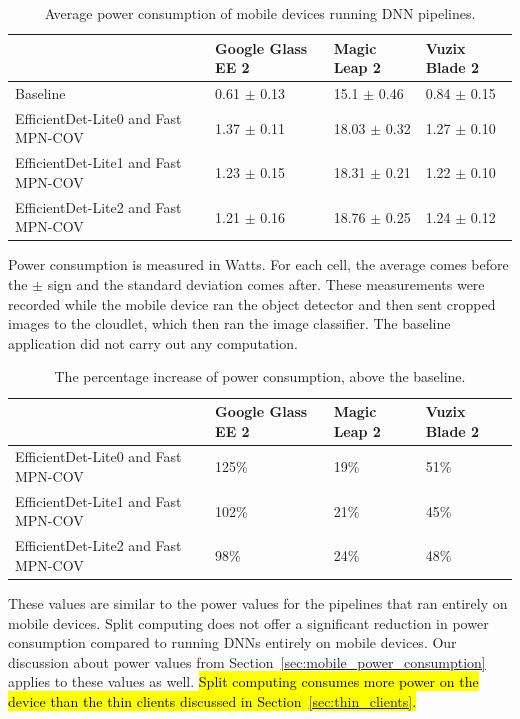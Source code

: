 \begin{table}
\begin{tabular}{|l||l|l|l|}
  \hline
  & Google Glass EE 2 & Magic Leap 2 & Vuzix Blade 2\\
  \hline
  \hline
  Baseline & 0.61 $\pm$ 0.13 & 15.1 $\pm$ 0.46 & 0.84 $\pm$ 0.15\\
  EfficientDet-Lite0 and Fast MPN-COV & 1.37 $\pm$ 0.11 & 18.03 $\pm$ 0.32 & 1.27 $\pm$ 0.10\\
  EfficientDet-Lite1 and Fast MPN-COV & 1.23 $\pm$ 0.15 & 18.31 $\pm$ 0.21 & 1.22 $\pm$ 0.10\\
  EfficientDet-Lite2 and Fast MPN-COV & 1.21 $\pm$ 0.16 & 18.76 $\pm$ 0.25 & 1.24 $\pm$ 0.12\\
  \hline
\end{tabular}
\begin{captiontext}
  Power consumption is measured in Watts.
  For each cell, the average comes before the $\pm$ sign and the standard
    deviation comes after.
    These measurements were recorded while the mobile device ran the object
    detector and then sent cropped images to the cloudlet, which then ran the
    image classifier.
    The baseline application did not carry out any computation.
  \end{captiontext}
  \caption{
    Average power consumption of mobile devices running DNN pipelines.
  }\label{tab:split_power}
\end{table}

\begin{table}
\begin{tabular}{|l||l|l|l|}
  \hline
  & Google Glass EE 2 & Magic Leap 2 & Vuzix Blade 2\\
  \hline
  \hline
  EfficientDet-Lite0 and Fast MPN-COV & 125\% & 19\% & 51\%\\
  EfficientDet-Lite1 and Fast MPN-COV & 102\% & 21\% & 45\%\\
  EfficientDet-Lite2 and Fast MPN-COV & 98\% & 24\% & 48\%\\
  \hline
\end{tabular}
  \caption{
    The percentage increase of power consumption, above the baseline.
  }\label{tab:split_power_percentage}
\end{table}

These values are similar to the power values for the pipelines that ran entirely
on mobile devices.
Split computing does not offer a significant reduction in power consumption
compared to running DNNs entirely on mobile devices.
Our discussion about power values from
Section~\ref{sec:mobile_power_consumption} applies to these values as well.
\hl{
  Split computing consumes more power on the device than the thin clients
  discussed in Section~{\ref{sec:thin_clients}}.
}

